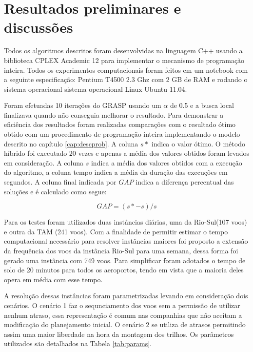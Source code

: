   \chapter{Resultados preliminares e discussões}

Todos os algoritmos descritos foram desenvolvidas na linguagem C++ usando a
biblioteca CPLEX Academic 12 para implementar o mecanismo de programação
inteira. Todos os experimentos computacionais foram feitos em um notebook com a
seguinte especificação: Pentium T4500 2.3 Ghz com 2 GB de RAM e rodando o
sistema operacional sistema operacional Linux Ubuntu 11.04.

Foram efetuadas 10 iterações do GRASP usando um $\alpha$ de 0.5 e a busca local
finalizava quando não conseguia melhorar o resultado. Para demonstrar a
eficiência dos resultados foram realizadas comparações com o resultado ótimo
obtido com um procedimento de programação inteira implementando o modelo
descrito no capítulo \ref{cap:descprob}. A coluna $s*$ indica o valor ótimo. O
método híbrido foi executado 20 vezes e apenas a média dos valores obtidos
foram levados em consideração. A coluna $s$ indica a média dos valores obtidos
com a execução do algoritmo, a coluna tempo indica a média da duração das
execuções em segundos. A coluna final indicada por $GAP$ indica a diferença
percentual das soluções e é calculado como segue:

\[  GAP = (s* - s)/s \]

Para os testes foram utilizados duas instâncias diárias, uma da Rio-Sul(107
voos) e outra da TAM (241 voos).  Com a finalidade de permitir estimar o tempo
computacional necessário para resolver instâncias maiores foi proposto a
extensão da frequência dos voos da instância Rio-Sul para uma semana, dessa
forma foi gerado uma instância com 749 voos. Para simplificar foram adotados o
tempo de solo de 20 minutos para todos os aeroportos, tendo em vista que a
maioria deles opera em média com esse tempo.

A resolução dessas instâncias foram parametrizadas levando em consideração dois
cenários. O cenário 1 faz o sequnciamento dos voos sem a permissão de utilizar
nenhum atraso, essa representação é comum nas companhias que não aceitam a
modificação do planejamento inicial. O cenário 2 se utiliza de atrasos
permitindo assim uma maior liberdade na hora da montagem dos trilhos. Os
parâmetros utilizados são detalhados na Tabela \ref{tab:params}.

